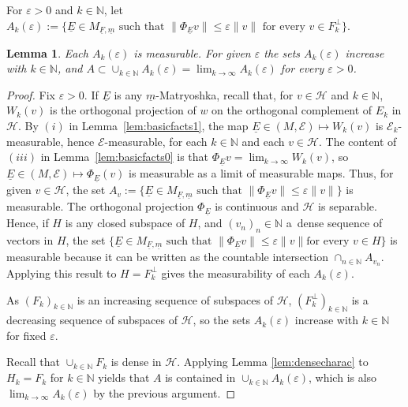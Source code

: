 \documentclass[pdftex]{sigma}%
\newcommand{\hilH}{\mathcal H}
\newcommand{\norm}[1]{\lVert #1\rVert}
\newcommand{\nN}{n\in \mathbb{N}}
\newcommand{\kN}{k\in \mathbb{N}}
\newcommand{\algE}{{\mathcal E}}
\newtheorem{Lemma}[Theorem]{Lemma}
\begin{document}
For $\varepsilon >0$ and $\kN$, let $A_{k}(\varepsilon):=\big\{\underline{E} \in M_{\underline{F},\underline{m}} \text{ such that } \norm{\Phi_{\underline{E}}v} \leq \varepsilon \norm{v} \text{ for every } v \in F_k^{\perp}\big\}$.

\begin{Lemma}%
Each $A_{k}(\varepsilon)$ is measurable. For given $\varepsilon$ the sets $A_{k}(\varepsilon)$ increase with $\kN$, and $A\subset \cup_{\kN} A_{k}(\varepsilon)=\lim_{k\to \infty} A_{k}(\varepsilon)$ for every $\varepsilon >0$.
\end{Lemma}

\begin{proof} Fix $\varepsilon >0$.
 If $\underline{E}$ is any $\underline{m}$-Matryoshka, recall that, for $v\in \hilH$ and $\kN$, $W_k(v)$ is the orthogonal projection of $w$ on the orthogonal complement of $E_k$ in $\hilH$. By $(i)$ in Lemma~\ref{lem:basicfacts1}, the map $\underline{E} \in (M,\algE) \mapsto W_k(v)$ is $\algE_k$-measurable, hence $\algE$-measurable, for each $\kN$ and each $v\in \hilH$. The content of $(iii)$ in Lemma~\ref{lem:basicfacts0} is that $\Phi_{\underline{E}} v=\lim_{k\to \infty} W_k(v)$, so $\underline{E} \in (M,\algE) \mapsto \Phi_{\underline{E}}(v)$ is measurable as a limit of measurable maps. Thus, for given $v\in \hilH$, the set $A_v:=\big\{\underline{E} \in M_{\underline{F},\underline{m}} \text{ such that } \norm{\Phi_{\underline{E}}v}\leq \varepsilon \norm{v} \big\}$ is measurable. The orthogonal projection $\Phi_{\underline{E}}$ is continuous and $\hilH$ is separable. Hence, if $H$ is any closed subspace of $H$, and $(v_n)_\nN$ a~dense sequence of vectors in $H$, the set $\big\{\underline{E} \in M_{\underline{F},\underline{m}} \text{ such that } \norm{\Phi_{\underline{E}}v} \leq \varepsilon \norm{v} \text{for every } v \in H\big\}$ is measurable because it can be written as the countable intersection $\cap_{\nN} A_{v_n}$. Applying this result to $H= F_k^{\perp}$ gives the measurability of each $A_{k}(\varepsilon)$.

As $(F_k)_{\kN}$ is an increasing sequence of subspaces of $\hilH$, $(F_k^\perp)_{\kN}$ is a decreasing sequence of subspaces of $\hilH$, so the sets $A_{k}(\varepsilon)$ increase with $\kN$ for fixed $\varepsilon$.

Recall that $\cup_{\kN} F_k$ is dense in $\hilH$. Applying Lemma \ref{lem:densecharac} to $H_k=F_k$ for $\kN$ yields that $A$ is contained in $\cup_{\kN} A_{k}(\varepsilon)$, which is also $\lim_{k\to \infty} A_{k}(\varepsilon)$ by the previous argument.
\end{proof}
\end{document}
